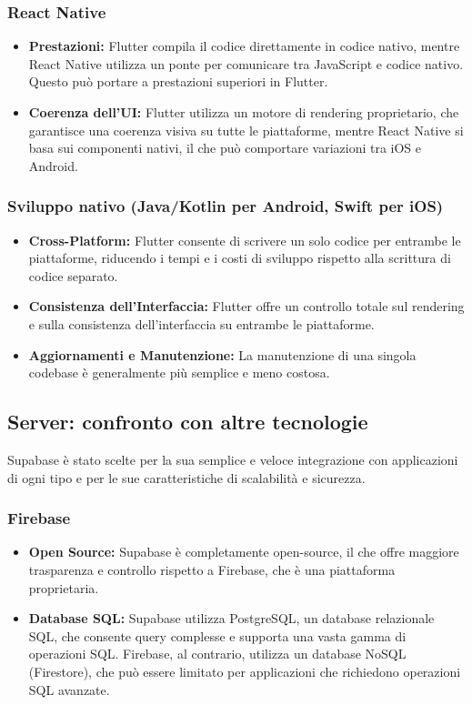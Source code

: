\subsubsection{React Native}
\begin{itemize}
    \item \textbf{Prestazioni:} Flutter compila il codice direttamente in codice nativo, mentre React Native utilizza un ponte per comunicare tra JavaScript e codice nativo. Questo può portare a prestazioni superiori in Flutter.
    \item \textbf{Coerenza dell'UI:} Flutter utilizza un motore di rendering proprietario, che garantisce una coerenza visiva su tutte le piattaforme, mentre React Native si basa sui componenti nativi, il che può comportare variazioni tra iOS e Android.
\end{itemize}

\subsubsection{Sviluppo nativo (Java/Kotlin per Android, Swift per iOS)}
\begin{itemize}
    \item \textbf{Cross-Platform:} Flutter consente di scrivere un solo codice per entrambe le piattaforme, riducendo i tempi e i costi di sviluppo rispetto alla scrittura di codice separato.
    \item \textbf{Consistenza dell'Interfaccia:} Flutter offre un controllo totale sul rendering e sulla consistenza dell'interfaccia su entrambe le piattaforme.
    \item \textbf{Aggiornamenti e Manutenzione:} La manutenzione di una singola codebase è generalmente più semplice e meno costosa.
\end{itemize}

\subsection{Server: confronto con altre tecnologie}
Supabase è stato scelte per la sua semplice e veloce integrazione con applicazioni di ogni tipo e per le sue caratteristiche di scalabilità e sicurezza.

\subsubsection{Firebase}
\begin{itemize}
    \item \textbf{Open Source:} Supabase è completamente open-source, il che offre maggiore trasparenza e controllo rispetto a Firebase, che è una piattaforma proprietaria.
    \item \textbf{Database SQL:} Supabase utilizza PostgreSQL, un database relazionale SQL, che consente query complesse e supporta una vasta gamma di operazioni SQL. Firebase, al contrario, utilizza un database NoSQL (Firestore), che può essere limitato per applicazioni che richiedono operazioni SQL avanzate.
\end{itemize}

